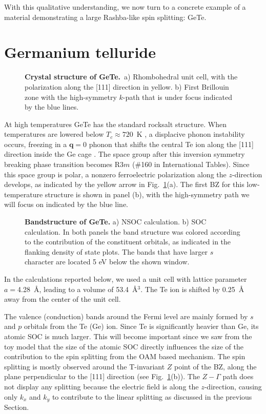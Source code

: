 With this qualitative understanding, we now turn to a concrete example of a material demonstrating a large Rashba-like spin splitting: GeTe.

\section{Germanium telluride}
\begin{figure}[h]
\caption{\label{fig:Rashba_crystal}{\bf Crystal structure of GeTe.}~a) Rhombohedral unit cell, with the polarization along the [111] direction in yellow. b) First Brillouin zone with the high-symmetry $k$-path that is under focus indicated by the blue lines.}
\end{figure}
At high temperatures GeTe has the standard rocksalt structure.
When temperatures are lowered below $T_c \approx 720$~K \cite{DiSante2013}, a displacive phonon instability occurs, freezing in a $\bm{q} = 0$ phonon that shifts the central Te ion along the [111] direction inside the Ge cage \cite{Rabe1987}.
The space group after this inversion symmetry breaking phase transition becomes R$3m$ (\#160 in International Tables).
Since this space group is polar, a nonzero ferroelectric polarization along the $z$-direction develops, as indicated by the yellow arrow in Fig.~\ref{fig:Rashba_crystal}(a).
The first \gls{BZ} for this low-temperature structure is shown in panel (b), with the high-symmetry path we will focus on indicated by the blue line.

\begin{figure}[h!]
\caption{\label{fig:Rashba_bands_dos}{\bf Bandstructure of GeTe.} a) \gls{NSOC} calculation. b) \gls{SOC} calculation. In both panels the band structure was colored according to the contribution of the constituent orbitals, as indicated in the flanking density of state plots. The bands that have larger $s$ character are located 5 eV below the shown window.}
\end{figure}
In the calculations reported below, we used a unit cell with lattice parameter $a=$4.28~\AA, leading to a volume of 53.4~\AA$^3$\cite{Nonaka2000}.
The Te ion is shifted by 0.25~\AA~ away from the center of the unit cell.

The valence (conduction) bands around the Fermi level are mainly formed by $s$ and $p$ orbitals from the Te (Ge) ion.
Since Te is significantly heavier than Ge, its atomic \gls{SOC} is much larger. This will become important since we saw from the toy model that the size of the atomic \gls{SOC} directly influences the size of the contribution to the spin splitting from the \gls{OAM} based mechanism.
The spin splitting is mostly observed around the \gls{T}-invariant $Z$ point of the \gls{BZ}, along the plane perpendicular to the [111] direction (see Fig.~\ref{fig:Rashba_crystal}(b)).
The $Z-\Gamma$ path does not display any splitting because the electric field is along the $z$-direction, causing only  $k_x$ and $k_y$ to contribute to the linear splitting as discussed in the previous Section.


